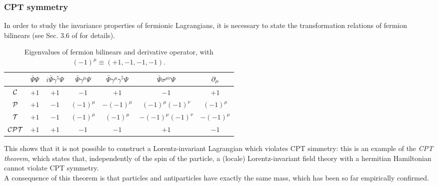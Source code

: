  \subsubsection{CPT symmetry}

 In order to study the invariance properties of fermionic Lagrangians, it is necessary to state the transformation relations of fermion bilinears (see Sec. 3.6 of \cite{peskin} for details).

 \begin{table}
  \centering
  \begin{tabular}{ccccccc}
    \hline
    \rule{0pt}{2.5ex} & $ \bar{\Psi} \Psi $ & $ i \bar{\Psi} \gamma^5 \Psi $ & $ \bar{\Psi} \gamma^\mu \Psi $ & $ \bar{\Psi} \gamma^\mu \gamma^5 \Psi $ & $ \bar{\Psi} \sigma^{\mu \nu} \Psi $ & $ \partial_\mu $ \\
    \hline
    \rule{0pt}{2.5ex} $ \mathcal{C} $ & $ +1 $ & $ +1 $ & $ -1 $ & $ +1 $ & $ -1 $ & $ +1 $ \\
    \rule{0pt}{2.5ex} $ \mathcal{P} $ & $ +1 $ & $ -1 $ & $ (-1)^\mu $ & $ - (-1)^\mu $ & $ (-1)^\mu (-1)^\nu $ & $ (-1)^\mu $ \\
    \rule{0pt}{2.5ex} $ \mathcal{T} $ & $ +1 $ & $ -1 $ & $ (-1)^\mu $ & $ (-1)^\mu $ & $ - (-1)^\mu (-1)^\nu $ & $ - (-1)^\mu $ \\
    \rule{0pt}{2.5ex} $ \mathcal{C}\mathcal{P}\mathcal{T} $ & $ +1 $ & $ +1 $ & $ -1 $ & $ -1 $ & $ +1 $ & $ -1 $
  \end{tabular}
  \caption{Eigenvalues of fermion bilinears and derivative operator, with $ (-1)^\mu \equiv (+1,-1,-1,-1) $.}
  \label{tab:ferm-bil-eigen}
 \end{table}

 This shows that it is not possible to construct a Lorentz-invariant Lagrangian which violates CPT simmetry: this is an example of the \textit{CPT theorem}, which states that, independently of the spin of the particle, a (locale) Lorentz-invariant field theory with a hermitian Hamiltonian cannot violate CPT symmetry.\\
 A consequence of this theorem is that particles and antiparticles have exactly the same mass, which has been so far empirically confirmed.










